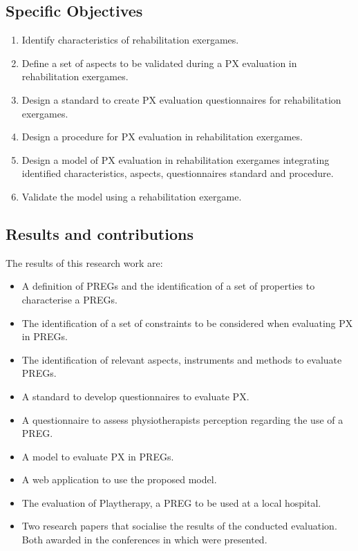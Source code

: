 \subsection{Specific Objectives}
\begin{enumerate}
\item Identify characteristics of rehabilitation exergames.
\item Define a set of aspects to be validated during a \ac{PX} evaluation in rehabilitation exergames.
\item Design a standard to create \ac{PX} evaluation questionnaires for rehabilitation exergames.
\item Design a procedure for \ac{PX} evaluation in rehabilitation exergames.
\item Design a model of \ac{PX} evaluation in rehabilitation exergames integrating identified characteristics, aspects, questionnaires standard and procedure.
\item Validate the model using a rehabilitation exergame.
\end{enumerate}
\subsection{Results and contributions}

The results of this research work are: 

\begin{itemize}
    \item A definition of \acp{PREG} and the identification of a set of properties to characterise a \acp{PREG}.
    \item The identification of a set of constraints to be considered when evaluating \ac{PX} in \acp{PREG}.
    \item The identification of relevant aspects, instruments and methods to evaluate \acp{PREG}.
    \item A standard to develop questionnaires to evaluate \ac{PX}.
    \item A questionnaire to assess physiotherapists perception regarding the use of a \ac{PREG}.
    \item A model to evaluate \ac{PX} in \acp{PREG}.
    \item A web application to use the proposed model.
    \item The evaluation of Playtherapy, a \ac{PREG} to be used at a local hospital.
    \item Two research papers that socialise the results of the conducted evaluation. Both awarded in the conferences in which were presented.
\end{itemize}

